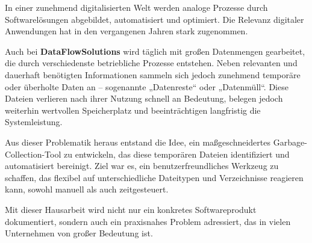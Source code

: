 

In einer zunehmend digitalisierten Welt werden analoge Prozesse durch Softwarelösungen abgebildet, automatisiert und optimiert. Die Relevanz digitaler Anwendungen hat in den vergangenen Jahren stark zugenommen. 

Auch bei \textbf{DataFlowSolutions} wird täglich mit großen Datenmengen gearbeitet, die durch verschiedenste betriebliche Prozesse entstehen. Neben relevanten und dauerhaft benötigten Informationen sammeln sich jedoch zunehmend temporäre oder überholte Daten an – sogenannte „Datenreste“ oder „Datenmüll“. Diese Dateien verlieren nach ihrer Nutzung schnell an Bedeutung, belegen jedoch weiterhin wertvollen Speicherplatz und beeinträchtigen langfristig die Systemleistung.

Aus dieser Problematik heraus entstand die Idee, ein maßgeschneidertes \sloppy Garbage-Collection-Tool zu entwickeln, das diese temporären Dateien identifiziert und automatisiert bereinigt. Ziel war es, ein benutzerfreundliches Werkzeug zu schaffen, das flexibel auf unterschiedliche Dateitypen und Verzeichnisse reagieren kann, sowohl manuell als auch zeitgesteuert.

Mit dieser Hausarbeit wird nicht nur ein konkretes Softwareprodukt dokumentiert, sondern auch ein praxisnahes Problem adressiert, das in vielen Unternehmen von großer Bedeutung ist.
